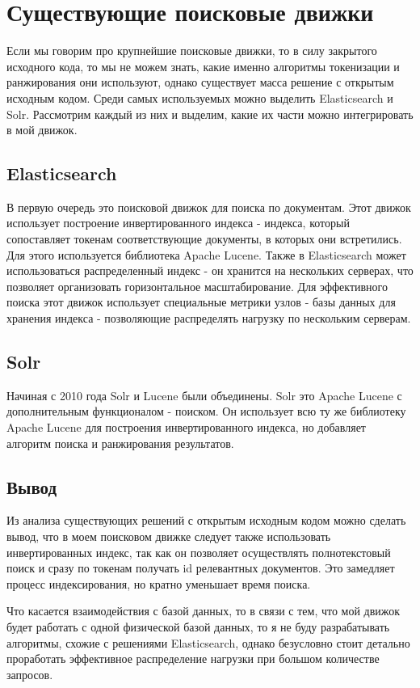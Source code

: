 \section{Существующие поисковые движки}
Если мы говорим про крупнейшие поисковые движки, то в силу закрытого исходного кода, то мы не можем знать, 
какие именно алгоритмы токенизации и ранжирования они используют, однако существует масса решение с открытым 
исходным кодом. Среди самых используемых можно выделить Elasticsearch и Solr. Рассмотрим каждый из них и 
выделим, какие их части можно интегрировать в мой движок.

\subsection{Elasticsearch}
В первую очередь это поисковой движок для поиска по документам. Этот движок использует построение инвертированного 
индекса - индекса, который сопоставляет токенам соответствующие документы, в которых они встретились. Для этого используется 
библиотека Apache Lucene. Также в Elasticsearch может использоваться распределенный индекс - он хранится на нескольких 
серверах, что позволяет организовать горизонтальное масштабирование. Для эффективного поиска этот движок использует 
специальные метрики узлов - базы данных для хранения индекса - позволяющие распределять нагрузку по нескольким серверам. 

\subsection{Solr}
Начиная с 2010 года Solr и Lucene были объединены. Solr это Apache Lucene с дополнительным функционалом - поиском. 
Он использует всю ту же библиотеку Apache Lucene для построения инвертированного индекса, но добавляет алгоритм поиска 
и ранжирования результатов. 

\subsection{Вывод}
Из анализа существующих решений с открытым исходным кодом можно сделать вывод, что в моем поисковом движке следует 
также использовать инвертированных индекс, так как он позволяет осуществлять полнотекстовый поиск и сразу по токенам 
получать id релевантных документов. Это замедляет процесс индексирования, но кратно уменьшает время поиска.

Что касается взаимодействия с базой данных, то в связи с тем, что мой движок будет работать с одной физической базой данных, 
то я не буду разрабатывать алгоритмы, схожие с решениями Elasticsearch, однако безусловно стоит детально проработать
эффективное распределение нагрузки при большом количестве запросов.
\enlargethispage{\baselineskip}


